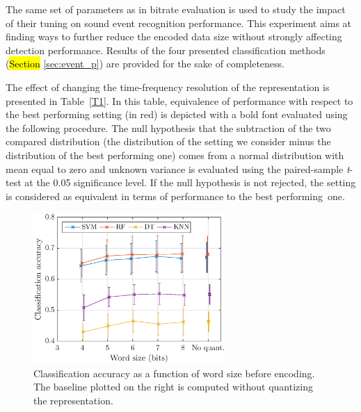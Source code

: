 \documentclass[sensors,article,accept,moreauthors,pdftex,10pt,a4paper]{mdpi}
\begin{document}
The same set of parameters as in bitrate evaluation is used to study the impact of their tuning on sound event recognition performance. This experiment aims at finding ways to further reduce the encoded data size without strongly affecting detection performance. Results of the four presented classification methods (\hl{Section} \ref{sec:event_p}) are provided for the sake of completeness.%

The effect of changing the time-frequency resolution of the representation is presented in Table~\ref{T1}. In this table, equivalence of performance with respect to the best performing setting (in red) is depicted with a bold font evaluated using the following procedure. The null hypothesis that the subtraction of the two compared distribution (the distribution of the setting we consider minus the distribution of the best performing one) comes from a normal distribution with mean equal to zero and unknown variance is evaluated using the paired-sample \emph{t}-test at the 0.05 significance level. If the null hypothesis is not rejected, the setting is considered as equivalent in terms of performance to the best \mbox{performing one.}

\begin{figure}[H]
	\centering
		\includegraphics[width=0.65\textwidth]{figures/class_mel_q.eps}
	\caption{Classification accuracy as a function of word size before encoding. The baseline plotted on the right is computed without quantizing the representation.}
	\label{fig:class_mel_q}
\end{figure}
\end{document}
